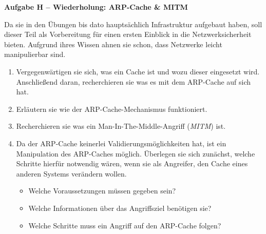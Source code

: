 \documentclass[paper=a4,fontsize=11pt]{scrartcl}%
\numberwithin{equation}{section}
\begin{document}
\begin{center}\Large{\textbf{Aufgabe H -- Wiederholung: ARP-Cache \& MITM}}\end{center}\vskip0.25in
Da sie in den Übungen bis dato hauptsächlich Infrastruktur aufgebaut haben, soll dieser Teil als Vorbereitung für einen ersten Einblick in die Netzwerksicherheit bieten. Aufgrund ihres Wissen ahnen sie schon, dass Netzwerke leicht manipulierbar sind.
\begin{enumerate}
	\item Vergegenwärtigen sie sich, was ein Cache ist und wozu dieser eingesetzt wird. Anschließend daran, recherchieren sie was es mit dem ARP-Cache auf sich hat.
	\item Erläutern sie wie der ARP-Cache-Mechanismus funktioniert.
	\item Recherchieren sie was ein Man-In-The-Middle-Angriff (\emph{MITM}) ist.
	\item Da der ARP-Cache keinerlei Validierungsmöglichkeiten hat, ist ein Manipulation des ARP-Caches möglich. Überlegen sie sich zunächst, welche Schritte hierfür notwendig wären, wenn sie als Angreifer, den Cache eines anderen Systems verändern wollen.
	\begin{itemize}
		\item Welche Voraussetzungen müssen gegeben sein?
		\item Welche Informationen über das Angriffsziel benötigen sie?
		\item Welche Schritte muss ein Angriff auf den ARP-Cache folgen?
	\end{itemize}
\end{enumerate}

\printbibliography
\end{document}
